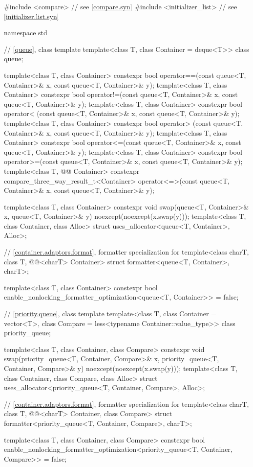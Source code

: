 \begin{codeblock}
#include <compare>              // see \ref{compare.syn}
#include <initializer_list>     // see \ref{initializer.list.syn}

namespace std {
  // \ref{queue}, class template 
  template<class T, class Container = deque<T>> class queue;

  template<class T, class Container>
    constexpr bool operator==(const queue<T, Container>& x, const queue<T, Container>& y);
  template<class T, class Container>
    constexpr bool operator!=(const queue<T, Container>& x, const queue<T, Container>& y);
  template<class T, class Container>
    constexpr bool operator< (const queue<T, Container>& x, const queue<T, Container>& y);
  template<class T, class Container>
    constexpr bool operator> (const queue<T, Container>& x, const queue<T, Container>& y);
  template<class T, class Container>
    constexpr bool operator<=(const queue<T, Container>& x, const queue<T, Container>& y);
  template<class T, class Container>
    constexpr bool operator>=(const queue<T, Container>& x, const queue<T, Container>& y);
  template<class T, @@ Container>
    constexpr compare_three_way_result_t<Container>
      operator<=>(const queue<T, Container>& x, const queue<T, Container>& y);

  template<class T, class Container>
    constexpr void swap(queue<T, Container>& x, queue<T, Container>& y)
      noexcept(noexcept(x.swap(y)));
  template<class T, class Container, class Alloc>
    struct uses_allocator<queue<T, Container>, Alloc>;

  // \ref{container.adaptors.format}, formatter specialization for 
  template<class charT, class T, @@<charT> Container>
    struct formatter<queue<T, Container>, charT>;

  template<class T, class Container>
    constexpr bool enable_nonlocking_formatter_optimization<queue<T, Container>> = false;

  // \ref{priority.queue}, class template 
  template<class T, class Container = vector<T>,
           class Compare = less<typename Container::value_type>>
    class priority_queue;

  template<class T, class Container, class Compare>
    constexpr void swap(priority_queue<T, Container, Compare>& x,
                        priority_queue<T, Container, Compare>& y) noexcept(noexcept(x.swap(y)));
  template<class T, class Container, class Compare, class Alloc>
    struct uses_allocator<priority_queue<T, Container, Compare>, Alloc>;

  // \ref{container.adaptors.format}, formatter specialization for 
  template<class charT, class T, @@<charT> Container, class Compare>
    struct formatter<priority_queue<T, Container, Compare>, charT>;

  template<class T, class Container, class Compare>
    constexpr bool
      enable_nonlocking_formatter_optimization<priority_queue<T, Container, Compare>> = false;
}
\end{codeblock}

